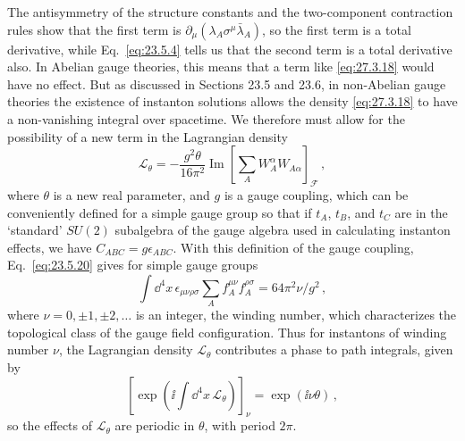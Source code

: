 The antisymmetry of the structure constants and the two-component
contraction rules show that the first term is
\(\partial_\mu(\lambda_A\sigma^\mu\bar\lambda_A)\),
so the first term is a total derivative, while Eq.~\eqref{eq:23.5.4}
tells us that the second term is a total derivative also. In Abelian gauge
theories, this means that a term like \eqref{eq:27.3.18} would have no
effect. But as discussed in Sections 23.5 and 23.6, in non-Abelian gauge
theories the existence of instanton solutions allows the density
\eqref{eq:27.3.18} to have a non-vanishing integral over spacetime. We
therefore must allow for the possibility of a new term in the Lagrangian
density
\begin{equation}
  \mathcal{L}_\theta
  =-\frac{g^2\theta}{16\pi^2}
  \operatorname{Im}\left[
    \sum_AW_A^\alpha W_{A\alpha}
  \right]_{\mathcal{F}}\,,
  \tag{27.3.19}\label{eq:27.3.19}
\end{equation}
where \(\theta\) is a new real parameter, and \(g\) is a gauge coupling,
which can be conveniently defined for a simple gauge group so that if
\(t_A\), \(t_B\), and \(t_C\) are in the `standard' \(SU(2)\) subalgebra
of the gauge algebra used in calculating instanton effects, we have
\(C_{ABC}=g\epsilon_{ABC}\). With this definition of the gauge coupling,
Eq.~\eqref{eq:23.5.20} gives for simple gauge groups
\begin{equation}
  \int \dd^4x\,\epsilon_{\mu\nu\rho\sigma}
  \sum_A f_A^{\mu\nu}f_A^{\rho\sigma}
  =64\pi^2\nu/g^2\,,
  \tag{27.3.20}\label{eq:27.3.20}
\end{equation}
where \(\nu=0,\mathbin{\pm}1,\mathbin{\pm}2,\ldots\) is an integer, the
winding number, which characterizes the topological class of the gauge
field configuration. Thus for instantons of winding number \(\nu\), the
Lagrangian density \(\mathcal{L}_\theta\) contributes a phase to path
integrals, given by
\begin{equation}
  \left[
    \exp\left(\ii\int \dd^4x\,\mathcal{L}_\theta\right)
  \right]_\nu
  =\exp(\ii\nu\theta)\,,
  \tag{27.3.21}\label{eq:27.3.21}
\end{equation}
so the effects of \(\mathcal{L}_\theta\) are periodic in \(\theta\), with
period \(2\pi\).

